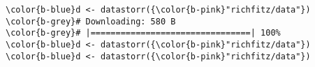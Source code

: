 \documentclass[class=minimal,border=0]{standalone}
\begin{document}
%
\begin{BVerbatim}[bgcolor=b-darkgrey]
\color{b-blue}d <- datastorr({\color{b-pink}"richfitz/data"})
\color{b-grey}# Downloading: 580 B
\color{b-grey}# |================================| 100%
\color{b-blue}d <- datastorr({\color{b-pink}"richfitz/data"})
\color{b-blue}d <- datastorr({\color{b-pink}"richfitz/data"})
\end{BVerbatim}
\end{document}
